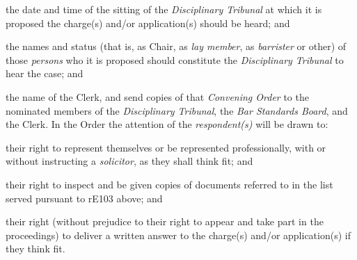 \item  the date and time of the sitting of the \emph{Disciplinary
Tribunal} at which it is proposed the charge(s) and/or application(s)
should be heard; and\\
\item  the names and status (that is, as Chair, as \emph{lay member},
as \emph{barrister} or other) of those \emph{persons} who it is proposed
should constitute the \emph{Disciplinary Tribunal} to hear the case;
and\\
\item  the name of the Clerk,\lr\ln
and send copies of that \emph{Convening Order} to the nominated members
of the \emph{Disciplinary Tribunal}, the\emph{ Bar Standards Board}, and
the Clerk. In the Order the attention of the \emph{respondent(s)} will
be drawn to:
\nl
\item their right to represent themselves or be represented
professionally, with or without instructing a \emph{solicitor}, as they
shall think fit; and
\item their right to inspect and be given copies of documents referred to
in the list served pursuant to rE103 above; and
\item their right (without prejudice to their right to appear and take
part in the proceedings) to deliver a written answer to the charge(s)
and/or application(s) if they think fit.\ln\lr\la

